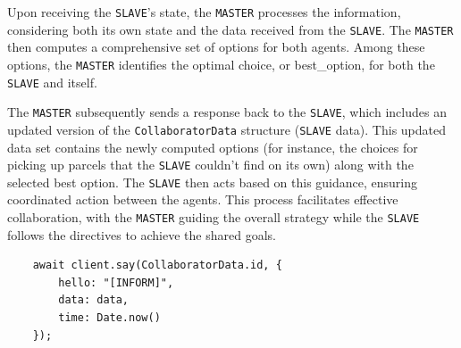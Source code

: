 \documentclass[12pt]{article}
\begin{document}
Upon receiving the \texttt{SLAVE}'s state, the \texttt{MASTER} processes the information, considering both its own state and the data received from the \texttt{SLAVE}. The \texttt{MASTER} then computes a comprehensive set of options for both agents. Among these options, the \texttt{MASTER} identifies the optimal choice, or best\_option, for both the \texttt{SLAVE} and itself.

The \texttt{MASTER} subsequently sends a response back to the \texttt{SLAVE}, which includes an updated version of the \texttt{CollaboratorData} structure (\texttt{SLAVE} data). This updated data set contains the newly computed options (for instance, the choices for picking up parcels that the \texttt{SLAVE} couldn't find on its own) along with the selected best option. The \texttt{SLAVE} then acts based on this guidance, ensuring coordinated action between the agents. This process facilitates effective collaboration, with the \texttt{MASTER} guiding the overall strategy while the \texttt{SLAVE} follows the directives to achieve the shared goals.

\begin{verbatim}
    await client.say(CollaboratorData.id, {
        hello: "[INFORM]",
        data: data,
        time: Date.now()
    });
\end{verbatim}

\end{document}
